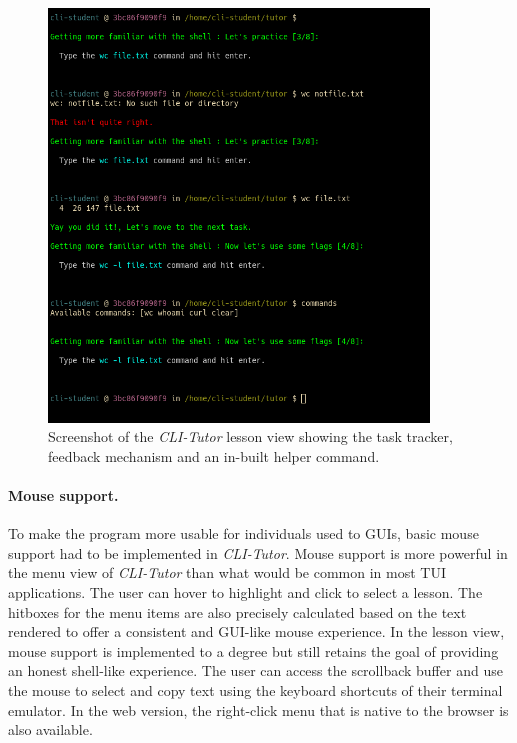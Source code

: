 \begin{figure}[htbp]
	\centering
	\includegraphics[width=0.9\textwidth]{img/lessonview}
	\caption{Screenshot of the \textit{CLI-Tutor} lesson view showing the task tracker, feedback mechanism and an in-built helper command.}
	\label{fig:lessonview}
\end{figure}


\paragraph{Mouse support.} To make the program more usable for individuals used
to GUIs, basic mouse support had to be implemented in \textit{CLI-Tutor}. Mouse
support is more powerful in the menu view of \textit{CLI-Tutor} than what would
be common in most TUI applications. The user can hover to highlight and click
to select a lesson. The hitboxes for the menu items are also precisely
calculated based on the text rendered to offer a consistent and GUI-like mouse
experience. In the lesson view, mouse support is implemented to a degree but
still retains the goal of providing an honest shell-like experience. The user
can access the scrollback buffer and use the mouse to select and copy text
using the keyboard shortcuts of their terminal emulator. In the web version, the
right-click menu that is native to the browser is also available.


